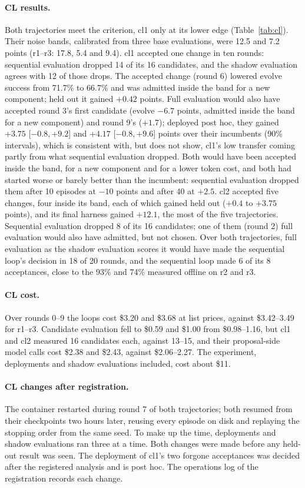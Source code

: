 \documentclass[11pt]{article}
\begin{document}
\paragraph{CL results.} Both trajectories meet the criterion, cl1 only at its lower edge (Table~\ref{tab:cl}). Their noise bands, calibrated from three base evaluations, were 12.5 and 7.2 points (r1--r3: 17.8, 5.4 and 9.4). cl1 accepted one change in ten rounds: sequential evaluation dropped 14 of its 16 candidates, and the shadow evaluation agrees with 12 of those drops. The accepted change (round 6) lowered evolve success from 71.7\% to 66.7\% and was admitted inside the band for a new component; held out it gained $+0.42$ points. Full evaluation would also have accepted round 3's first candidate (evolve $-6.7$ points, admitted inside the band for a new component) and round 9's ($+1.7$); deployed post hoc, they gained $+3.75$ [$-0.8,+9.2$] and $+4.17$ [$-0.8,+9.6$] points over their incumbents (90\% intervals), which is consistent with, but does not show, cl1's low transfer coming partly from what sequential evaluation dropped. Both would have been accepted inside the band, for a new component and for a lower token cost, and both had started worse or barely better than the incumbent: sequential evaluation dropped them after 10 episodes at $-10$ points and after 40 at $+2.5$. cl2 accepted five changes, four inside its band, each of which gained held out ($+0.4$ to $+3.75$ points), and its final harness gained $+12.1$, the most of the five trajectories. Sequential evaluation dropped 8 of its 16 candidates; one of them (round 2) full evaluation would also have admitted, but not chosen. Over both trajectories, full evaluation as the shadow evaluation scores it would have made the sequential loop's decision in 18 of 20 rounds, and the sequential loop made 6 of its 8 acceptances, close to the 93\% and 74\% measured offline on r2 and r3.

\paragraph{CL cost.} Over rounds 0--9 the loops cost \$3.20 and \$3.68 at list prices, against \$3.42--3.49 for r1--r3. Candidate evaluation fell to \$0.59 and \$1.00 from \$0.98--1.16, but cl1 and cl2 measured 16 candidates each, against 13--15, and their proposal-side model calls cost \$2.38 and \$2.43, against \$2.06--2.27. The experiment, deployments and shadow evaluations included, cost about \$11.

\paragraph{CL changes after registration.} The container restarted during round 7 of both trajectories; both resumed from their checkpoints two hours later, reusing every episode on disk and replaying the stopping order from the same seed. To make up the time, deployments and shadow evaluations ran three at a time. Both changes were made before any held-out result was seen. The deployment of cl1's two forgone acceptances was decided after the registered analysis and is post hoc. The operations log of the registration records each change.
\end{document}

